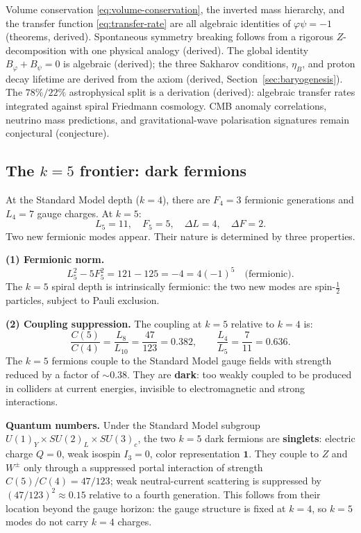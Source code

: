 \documentclass[12pt,a4paper]{article}
\begin{document}
\noindent Volume conservation \eqref{eq:volume-conservation}, the inverted mass hierarchy, and the transfer function \eqref{eq:transfer-rate} are all algebraic identities of $\varphi\psi = -1$ (theorems, derived).  Spontaneous symmetry breaking follows from a rigorous $Z$-decomposition with one physical analogy (derived).  The global identity $B_\varphi + B_\psi = 0$ is algebraic (derived); the three Sakharov conditions, $\eta_B$, and proton decay lifetime are derived from the axiom (derived, Section~\ref{sec:baryogenesis}).  The $78\%/22\%$ astrophysical split is a derivation (derived): algebraic transfer rates integrated against spiral Friedmann cosmology.  CMB anomaly correlations, neutrino mass predictions, and gravitational-wave polarisation signatures remain conjectural (conjecture).

\subsection{The $k = 5$ frontier: dark fermions}
\label{sec:k5-dark-fermions}

At the Standard Model depth ($k = 4$), there are $F_4 = 3$ fermionic generations and $L_4 = 7$ gauge charges. At $k = 5$:
\begin{equation}
L_5 = 11, \quad F_5 = 5, \quad \Delta L = 4, \quad \Delta F = 2.
\end{equation}
Two new fermionic modes appear. Their nature is determined by three properties.

\textbf{(1) Fermionic norm.}
\begin{equation}
L_5^2 - 5F_5^2 = 121 - 125 = -4 = 4(-1)^5 \quad \text{(fermionic)}.
\end{equation}
The $k = 5$ spiral depth is intrinsically fermionic: the two new modes are spin-$\frac{1}{2}$ particles, subject to Pauli exclusion.

\textbf{(2) Coupling suppression.} The coupling at $k = 5$ relative to $k = 4$ is:
\begin{equation}
\frac{C(5)}{C(4)} = \frac{L_8}{L_{10}} = \frac{47}{123} = 0.382, \qquad
\frac{L_4}{L_5} = \frac{7}{11} = 0.636.
\end{equation}
The $k = 5$ fermions couple to the Standard Model gauge fields with strength reduced by a factor of $\sim 0.38$. They are \textbf{dark}: too weakly coupled to be produced in colliders at current energies, invisible to electromagnetic and strong interactions.

\textbf{Quantum numbers.} Under the Standard Model subgroup $U(1)_Y \times SU(2)_L \times SU(3)_c$, the two $k = 5$ dark fermions are \textbf{singlets}: electric charge $Q = 0$, weak isospin $I_3 = 0$, color representation $\mathbf{1}$. They couple to $Z$ and $W^\pm$ only through a suppressed portal interaction of strength $C(5)/C(4) = 47/123$; weak neutral-current scattering is suppressed by $(47/123)^2 \approx 0.15$ relative to a fourth generation. This follows from their location beyond the gauge horizon: the gauge structure is fixed at $k = 4$, so $k = 5$ modes do not carry $k = 4$ charges.
\end{document}
